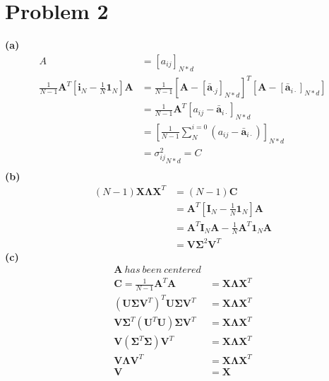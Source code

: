 \documentclass[11pt]{scrartcl}
\begin{document}
\section*{Problem 2}
\textbf{(a)}\\
\begin{equation*}
\begin{aligned}
A&=[a_{ij}]_{N*d}\\
\frac{1}{N-1} \bm{A}^T[\bm{i}_N- \frac{1}{N}\bm{1}_N]\bm{A}
&=\frac{1}{N-1}{ [\bm{A}- 
[\bar{\bm{a}}_{\cdot j}]_{N*d}]}^T[\bm{A}- 
[\bar{\bm{a}}_{i \cdot}]_{N*d}]\\
&=\frac{1}{N-1} \bm{A}^T{[a_{ij}-\bar{\bm{a}}_{i \cdot}]}_{N*d}\\
&=[\frac{1}{N-1}\sum_{N}^{i=0}(a_{ij}-\bar{\bm{a}}_{i\cdot})]_{N*d}\\
&={\sigma^2_{ij}}_{N*d}=C\\
\end{aligned}
\end{equation*}
\textbf{(b)}\\
\begin{equation*}
\begin{aligned}
(N-1) \bm{X \Lambda X}^T
&=(N-1)\bm{C}\\
&= \bm{A}^T[\bm{I}_N-\frac{1}{N}\bm{1}_N]\bm{A}\\
&= \bm{A}^T \bm{I}_N \bm{A}-\frac{1}{N}\bm{A}^T \bm{1}_N \bm{A}\\
&= \bm{V\Sigma}^2\bm{V}^T
\end{aligned}
\end{equation*}
\textbf{(c)}\\
\begin{equation*}
\begin{aligned}
\bm{A}\ has\ been\ centered\\
\bm{C}=\frac{1}{N-1}\bm{A}^T\bm{A}&=\bm{X \Lambda X}^T\\
(\bm{U }\bm{\Sigma V}^T)^T \bm{U \Sigma V}^T&=\bm{X \Lambda X}^T\\
\bm{V}\bm{\Sigma}^T (\bm{U}^T\bm{U})\bm{\Sigma V}^T&=\bm{X \Lambda X}^T\\
\bm{V}(\bm{\Sigma}^T\bm{\Sigma})\bm{ V}^T&=\bm{X \Lambda X}^T\\
\bm{V}\bm{\Lambda}\bm{V}^T&=\bm{X \Lambda X}^T\\
\bm{V}&=\bm{X}
\end{aligned}
\end{equation*}
\end{document}
